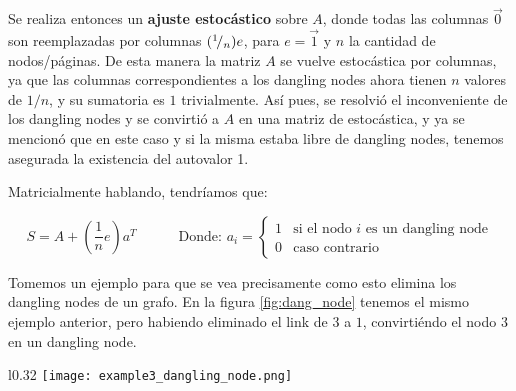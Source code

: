\par Se realiza entonces un \textbf{ajuste estoc\'astico} sobre $A$, donde todas
las columnas $\vec{0}$ son reemplazadas por columnas
$({}^{1}\!/_{n})e$, para $e = \vec{1}$ y $n$ la cantidad de
nodos/p\'aginas. De esta manera la matriz $A$ se vuelve estoc\'astica por
columnas, ya que las columnas correspondientes a los dangling
nodes ahora tienen $n$ valores de $1/n$, y su sumatoria es $1$ trivialmente.
As\'i pues, se resolvi\'o el inconveniente de los dangling nodes y se
convirti\'o a $A$ en una matriz de estoc\'astica, y ya se mencion\'o que en este
caso y si la misma estaba libre de dangling nodes, tenemos asegurada la
existencia del autovalor 1.

\par Matricialmente hablando, tendr\'iamos que:

\begin{equation}
    S = A + \left(\dfrac{1}{n}e\right)a^T \quad\quad\quad
        \text{Donde: } a_i =
        \begin{cases}
            1 &\text{si el nodo $i$ es un dangling node}\\
            0 &\text{caso contrario}
        \end{cases}\label{eq:S}
\end{equation}
\medskip

\par Tomemos un ejemplo para que se vea precisamente como esto elimina los
dangling nodes de un grafo. En la figura \ref{fig:dang_node} tenemos el mismo
ejemplo anterior, pero habiendo eliminado el link de $3$ a $1$, convirti\'endo
el nodo $3$ en un dangling node.

\begin{wrapfigure}[8]{l}{0.32\textwidth}
    \texttt{[image: example3\_dangling\_node.png]}
    \caption{Dangling Nodes}
    \label{fig:dang_node}
\end{wrapfigure}
\noindent

